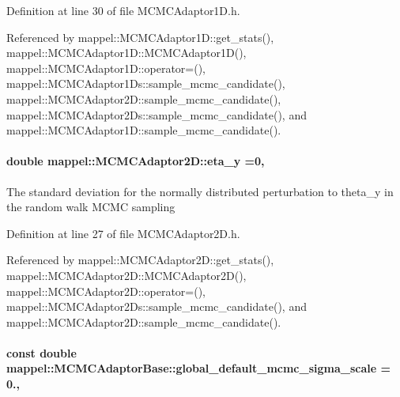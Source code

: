 Definition at line 30 of file M\+C\+M\+C\+Adaptor1\+D.\+h.



Referenced by mappel\+::\+M\+C\+M\+C\+Adaptor1\+D\+::get\+\_\+stats(), mappel\+::\+M\+C\+M\+C\+Adaptor1\+D\+::\+M\+C\+M\+C\+Adaptor1\+D(), mappel\+::\+M\+C\+M\+C\+Adaptor1\+D\+::operator=(), mappel\+::\+M\+C\+M\+C\+Adaptor1\+Ds\+::sample\+\_\+mcmc\+\_\+candidate(), mappel\+::\+M\+C\+M\+C\+Adaptor2\+D\+::sample\+\_\+mcmc\+\_\+candidate(), mappel\+::\+M\+C\+M\+C\+Adaptor2\+Ds\+::sample\+\_\+mcmc\+\_\+candidate(), and mappel\+::\+M\+C\+M\+C\+Adaptor1\+D\+::sample\+\_\+mcmc\+\_\+candidate().

\paragraph[{\texorpdfstring{eta\+\_\+y}{eta_y}}]{\setlength{\rightskip}{0pt plus 5cm}double mappel\+::\+M\+C\+M\+C\+Adaptor2\+D\+::eta\+\_\+y =0\hspace{0.3cm}{\ttfamily [protected]}, {\ttfamily [inherited]}}\hypertarget{classmappel_1_1MCMCAdaptor2D_a8e49652147538fe2a12943522f1a8b30}{}\label{classmappel_1_1MCMCAdaptor2D_a8e49652147538fe2a12943522f1a8b30}
The standard deviation for the normally distributed perturbation to theta\+\_\+y in the random walk M\+C\+MC sampling 

Definition at line 27 of file M\+C\+M\+C\+Adaptor2\+D.\+h.



Referenced by mappel\+::\+M\+C\+M\+C\+Adaptor2\+D\+::get\+\_\+stats(), mappel\+::\+M\+C\+M\+C\+Adaptor2\+D\+::\+M\+C\+M\+C\+Adaptor2\+D(), mappel\+::\+M\+C\+M\+C\+Adaptor2\+D\+::operator=(), mappel\+::\+M\+C\+M\+C\+Adaptor2\+Ds\+::sample\+\_\+mcmc\+\_\+candidate(), and mappel\+::\+M\+C\+M\+C\+Adaptor2\+D\+::sample\+\_\+mcmc\+\_\+candidate().

\paragraph[{\texorpdfstring{global\+\_\+default\+\_\+mcmc\+\_\+sigma\+\_\+scale}{global_default_mcmc_sigma_scale}}]{\setlength{\rightskip}{0pt plus 5cm}const double mappel\+::\+M\+C\+M\+C\+Adaptor\+Base\+::global\+\_\+default\+\_\+mcmc\+\_\+sigma\+\_\+scale = 0.\hspace{0.3cm}{\ttfamily [static]}, {\ttfamily [inherited]}}\hypertarget{classmappel_1_1MCMCAdaptorBase_a44cebca0e27135c854fa8430d2d89929}{}\label{classmappel_1_1MCMCAdaptorBase_a44cebca0e27135c854fa8430d2d89929}


